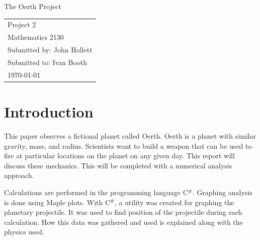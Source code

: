\documentclass[12pt]{extarticle}
\begin{document}
\begin{titlepage}
\vspace*{2in}
\begin{center}
{\LARGE The Oerth Project}
\end{center}

\vspace{2cm}



\vspace{3in}
\begin{flushright}
\begin{tabular}{l}
Project 2 \\
Mathematics 2130\\
Submitted by: John Hollett\\
Submitted to: Ivan Booth\\
\today
\end{tabular}
\end{flushright}


\end{titlepage}


\rfoot{\thepage}




\section{Introduction}
This paper observes a fictional planet called Oerth. Oerth is a planet with similar gravity, mass, and radius. Scientists want to build a weapon that can be used to fire at particular locations on the planet on any given day. This report will discuss these mechanics. This will be completed with a numerical analysis approach. 

Calculations are performed in the programming language C$^{\#}$. Graphing analysis is done using Maple plots. With C$^{\#}$, a utility was created for graphing the planetary projectile. It was used to find position of the projectile during each calculation. How this data was gathered and used is explained along with the physics used. 
 
\end{document}
